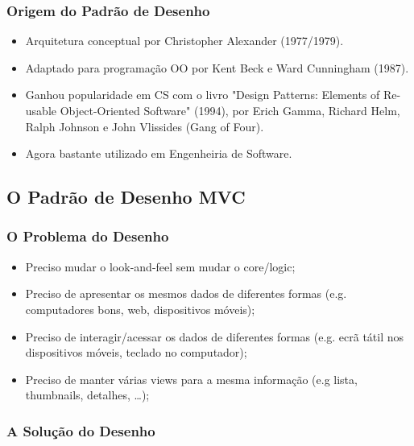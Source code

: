 \documentclass{article}
\begin{document}
\pagebreak

\subsubsection{Origem do Padrão de Desenho}

\begin{flushleft}
  \begin{itemize}
  \item Arquitetura conceptual por Christopher Alexander (1977/1979).
  \item Adaptado para programação OO por Kent Beck e Ward Cunningham (1987).
  \item Ganhou popularidade em CS com o livro "Design Patterns: Elements of Re-usable Object-Oriented Software" (1994),
  por Erich Gamma, Richard Helm, Ralph Johnson e John Vlissides (Gang of Four).
  \item Agora bastante utilizado em Engenheiria de Software.
  \end{itemize}
\end{flushleft}

\subsection{O Padrão de Desenho MVC}

\subsubsection{O Problema do Desenho}

\begin{flushleft}
  \begin{itemize}
    \item Preciso mudar o look-and-feel sem mudar o core/logic;
    \item Preciso de apresentar os mesmos dados de diferentes formas (e.g. computadores bons, web, dispositivos móveis);
    \item Preciso de interagir/acessar os dados de diferentes formas (e.g. ecrã tátil nos dispositivos móveis, teclado no computador);
    \item Preciso de manter várias views para a mesma informação (e.g lista, thumbnails, detalhes, \dots);
  \end{itemize}
\end{flushleft}

\subsubsection{A Solução do Desenho}
\end{document}

